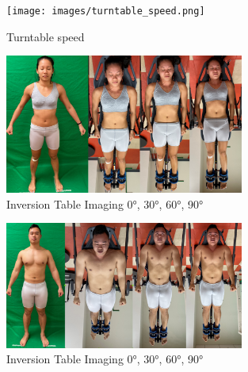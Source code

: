 \begin{figure}[!htb]
        \caption{Turntable speed}
        \centering
        \texttt{[image: images/turntable\_speed.png]}
\end{figure}

\begin{figure}[!htb]
        \caption{Inversion Table Imaging \ang{0}, \ang{30}, \ang{60}, \ang{90}}
        \centering
        \includegraphics[width=0.7\textwidth]{images/en_inversion.png}
\end{figure}
\begin{figure}[!htb]
        \caption{Inversion Table Imaging \ang{0}, \ang{30}, \ang{60}, \ang{90}}
        \centering
        \includegraphics[width=0.7\textwidth]{images/mw_inversion.png}
\end{figure}
